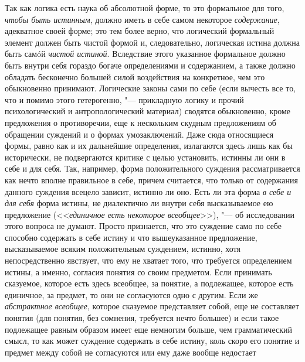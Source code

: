 {Так как логика есть наука об абсолютной форме, то это
формальное для того, {\em чтобы быть
истинным}, должно иметь в себе самом некоторое
{\em содержание},
адекватное своей форме; это тем более верно, что логический
формальный элемент должен быть чистой формой и, следовательно, логическая
истина должна быть самóй {\em чистой
истиной}. Вследствие этого указанное формальное должно быть
внутри себя гораздо богаче определениями и содержанием, а также должно
обладать бесконечно большей силой воздействия на конкретное, чем это
обыкновенно
принимают.
Логические законы сами по себе (если вычесть все то, что и
помимо этого гетерогенно, "--- прикладную логику и прочий
психологический и антропологический материал) сводятся обыкновенно, кроме
предложения о противоречии, еще к нескольким скудным предложениям об
обращении суждений и о формах умозаключений. Даже сюда относящиеся формы,
равно как и их дальнейшие определения, излагаются здесь лишь как бы
исторически, не подвергаются критике с целью установить, истинны ли они в
себе и для себя. Так, например, форма положительного суждения
рассматривается как нечто вполне правильное в себе, причем
считается, что только от содержания данного суждения всецело зависит,
истинно ли оно. Есть ли эта форма {\em в
себе и для себя} форма истины, не диалектично ли внутри себя
высказываемое ею предложение
(<<{\em единичное есть некоторое
всеобщее}>>), "--- об исследовании этого вопроса не думают. Просто
признается, что это суждение само по себе способно содержать в
себе истину и что вышеуказанное предложение, высказываемое всяким
положительным суждением, истинно, хотя непосредственно явствует, что ему не
хватает того, что требуется определением истины, а именно, согласия понятия
со своим предметом. Если принимать сказуемое, которое есть здесь всеобщее,
за понятие, а подлежащее, которое есть единичное, за предмет, то они не
согласуются одно с другим. Если же
{\em абстрактное всеобщее},
которое сказуемое представляет собой, еще не составляет
понятия (для понятия, без сомнения, требуется нечто большее) и если такое
подлежащее равным образом имеет еще немногим больше, чем грамматический
смысл, то как может суждение содержать в себе истину, коль скоро его
понятие и предмет между собой не согласуются или ему даже вообще недостает
}
